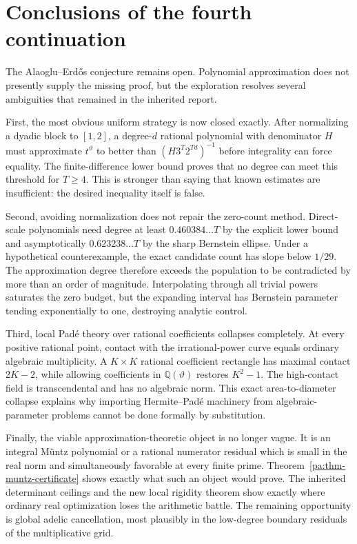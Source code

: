 \documentclass[11pt,oneside]{article}
\theoremstyle{definition}
\theoremstyle{remark}
\newcommand{\Q}{\mathbb Q}
\newcommand{\thetaq}{\vartheta}
\begin{document}
\section{Conclusions of the fourth continuation}
\label{pa:sec-conclusion}

The Alaoglu--Erd\H{o}s conjecture remains open.  Polynomial approximation does not presently
supply the missing proof, but the exploration resolves several ambiguities that remained in
the inherited report.

First, the most obvious uniform strategy is now closed exactly.  After normalizing a dyadic
block to \([1,2]\), a degree-\(d\) rational polynomial with denominator \(H\) must approximate
\(t^{\thetaq}\) to better than \((H3^T2^{Td})^{-1}\) before integrality can force equality.
The finite-difference lower bound proves that no degree can meet this threshold for
\(T\ge4\).  This is stronger than saying that known estimates are insufficient: the desired
inequality itself is false.

Second, avoiding normalization does not repair the zero-count method.  Direct-scale
polynomials need degree at least \(0.460384\ldots T\) by the explicit lower bound and
asymptotically \(0.623238\ldots T\) by the sharp Bernstein ellipse.  Under a hypothetical
counterexample, the exact candidate count has slope below \(1/29\).  The approximation degree
therefore exceeds the population to be contradicted by more than an order of magnitude.
Interpolating through all trivial powers saturates the zero budget, but the expanding interval
has Bernstein parameter tending exponentially to one, destroying analytic control.

Third, local Pad\'e theory over rational coefficients collapses completely.  At every positive
rational point, contact with the irrational-power curve equals ordinary algebraic multiplicity.
A \(K\times K\) rational coefficient rectangle has maximal contact \(2K-2\), while allowing
coefficients in \(\Q(\thetaq)\) restores \(K^2-1\).  The high-contact field is transcendental
and has no algebraic norm.  This exact area-to-diameter collapse explains why importing
Hermite--Pad\'e machinery from algebraic-parameter problems cannot be done formally by
substitution.

Finally, the viable approximation-theoretic object is no longer vague.  It is an integral
M\"untz polynomial or a rational numerator residual which is small in the real norm and
simultaneously favorable at every finite prime.  Theorem~\ref{pa:thm-muntz-certificate} shows
exactly what such an object would prove.  The inherited determinant ceilings and the new local
rigidity theorem show exactly where ordinary real optimization loses the arithmetic battle.
The remaining opportunity is global adelic cancellation, most plausibly in the low-degree
boundary residuals of the multiplicative grid.
\end{document}
